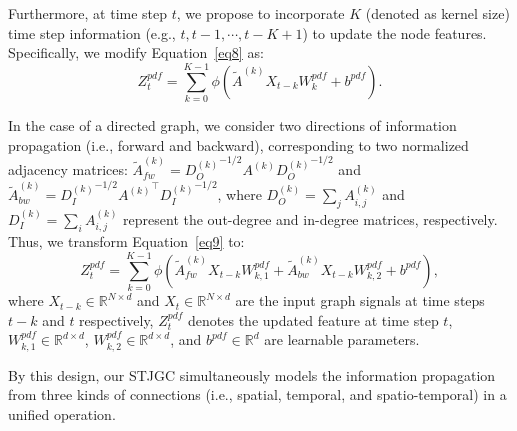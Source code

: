 \documentclass[10pt,journal,compsoc]{IEEEtran}
\begin{document}
Furthermore, at time step $ t $, we propose to incorporate $ K $ (denoted as kernel size) time step information (e.g., $ t,t-1,\cdots,t-K+1 $) to update the node features. Specifically, we modify Equation~\ref{eq8} as: 
%
\begin{equation}
Z_t^{pdf}=\sum_{k=0}^{K-1}\phi(\tilde{A}^{(k)}X_{t-k}W_k^{pdf}+b^{pdf}).
\label{eq9}
\end{equation}
%

In the case of a directed graph, we consider two directions of information propagation (i.e., forward and backward), corresponding to two normalized adjacency matrices: $ \tilde{A}_{fw}^{(k)}={D_{O}^{(k)}}^{-1/2}A^{(k)}{D_{O}^{(k)}}^{-1/2} $ and $ \tilde{A}_{bw}^{(k)}={D_{I}^{(k)}}^{-1/2}{A^{(k)}}^\top{D_{I}^{(k)}}^{-1/2} $, where $ D_O^{(k)}= \sum_{j}A_{i,j}^{(k)} $ and $ D_I^{(k)}= \sum_{i}A_{i,j}^{(k)} $ represent the out-degree and in-degree matrices, respectively. Thus, we transform Equation~\ref{eq9} to:
%
\begin{equation}
Z_t^{pdf}=\sum_{k=0}^{K-1}\phi(\tilde{A}_{fw}^{(k)}X_{t-k}W_{k,1}^{pdf}+\tilde{A}_{bw}^{(k)}X_{t-k}W_{k,2}^{pdf}+b^{pdf}),
\label{eq10}
\end{equation}
%
where $ X_{t-k} \in \mathbb{R}^{N \times d} $ and $ X_{t} \in \mathbb{R}^{N \times d} $ are the input graph signals at time steps $ t-k $ and $ t $ respectively, $ Z_t^{pdf} $ denotes the updated feature at time step $ t $, $ W_{k,1}^{pdf} \in \mathbb{R}^{d \times d} $, $ W_{k,2}^{pdf} \in \mathbb{R}^{d \times d} $, and $ b^{pdf} \in \mathbb{R}^{d} $ are learnable parameters.

By this design, our STJGC simultaneously models the information propagation from three kinds of connections (i.e., spatial, temporal, and spatio-temporal) in a unified operation. 
\end{document}
